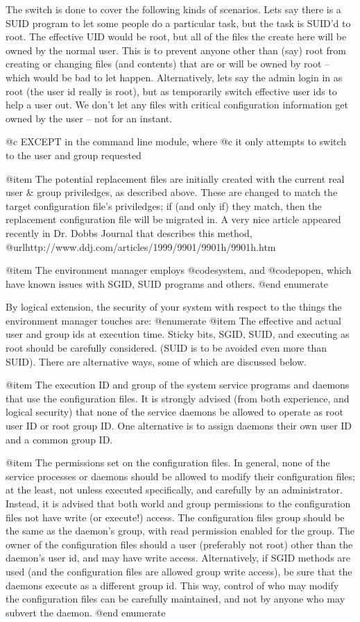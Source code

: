 {{The switch is done to cover the following kinds of scenarios.  Lets say there
is a SUID program to let some people do a particular task, but the task is
SUID'd to root.  The effective UID would be root, but all of the files the
create here will be owned by the normal user.  This is to prevent anyone
other than (say) root from creating or changing files (and contents) that
are or will be owned by root --  which would be bad to let happen.
Alternatively, lets say the admin login in as root (the user id really is
root),  but as temporarily switch effective user ids to help a user out.
We don't let any files with critical configuration information
get owned by the user -- not for an instant.

@c EXCEPT in the command line module, where
@c it only attempts to switch to the user and group requested

@item The potential replacement files are initially created with the current
real user & group priviledges, as described above.  These are changed to match
the target configuration file's priviledges; if (and only if) they match, then
the replacement configuration file will be migrated in.  A very nice article
appeared recently in Dr. Dobbs Journal that describes this method,
@url{http://www.ddj.com/articles/1999/9901/9901h/9901h.htm}

@item The environment manager employs @code{system}, and @code{popen}, which
have known issues with SGID, SUID programs and others.
@end enumerate

By logical extension, the security of your system with respect to the things
the environment manager touches are:
@enumerate
@item The effective and actual user and group ids at execution time.  Sticky
bits, SGID, SUID, and executing as root should be carefully considered.  (SUID
is to be avoided even more than SUID). There are alternative ways, some of
which are discussed below.

@item The execution ID and group of the system service programs and daemons
that use the configuration files.  It is strongly advised (from both
experience, and logical security) that none of the service daemons be allowed
to operate as root user ID or root group ID.  One alternative is to assign
daemons their own user ID and a common group ID.

@item The permissions set on the configuration files.  In general, none of the
service processes or daemons should be allowed to modify their configuration
files; at the least, not unless executed specifically, and carefully by an
administrator.  Instead, it is advised that both world and group permissions
to the configuration files not have write (or execute!) access.  The
configuration files group should be the same as the daemon's group, with read
permission enabled for the group.  The owner of the configuration files should
a user (preferably not root) other than the daemon's user id, and may have
write access.  Alternatively, if SGID methods are used (and the configuration
files are allowed group write access), be sure that the daemons execute as a
different group id.   This way, control of who may modify the configuration
files can be carefully maintained, and not by anyone who may subvert the
daemon.
@end enumerate

}}

